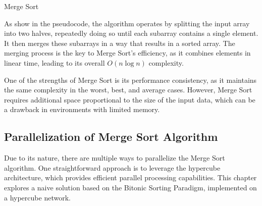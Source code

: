 \documentclass[12pt,conference]{ieeeconf} %
\begin{document}
\begin{algorithm}[h]
\vspace{0.5em}
\caption{Merge Sort}
\vspace{0.25em}
\SetAlgoLined
{}

\vspace{0.5em}
\end{algorithm}
As show in the pseudocode, the algorithm operates by splitting the input array into two halves, repeatedly doing so until each subarray contains a single element. It then merges these subarrays in a way that results in a sorted array. The merging process is the key to Merge Sort's efficiency, as it combines elements in linear time, leading to its overall $O(n\log n)$ complexity.\par
One of the strengths of Merge Sort is its performance consistency, as it maintains the same complexity in the worst, best, and average cases. However, Merge Sort requires additional space proportional to the size of the input data, which can be a drawback in environments with limited memory.

\subsection{Parallelization of Merge Sort Algorithm}
Due to its nature, there are multiple ways to parallelize the Merge Sort algorithm. One straightforward approach is to leverage the hypercube architecture, which provides efficient parallel processing capabilities. This chapter explores a naive solution based on the Bitonic Sorting Paradigm, implemented on a hypercube network.
\end{document}
